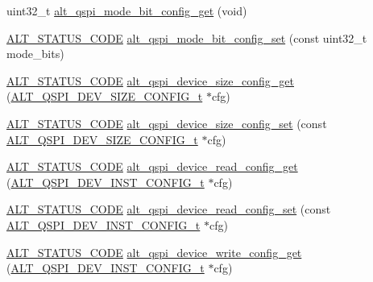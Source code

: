 \begin{DoxyCompactItemize}
\item 
uint32\+\_\+t \mbox{\hyperlink{group__ALT__QSPI__DEV__CFG_ga842b7ccf9d836ca4073713967ffc1272}{alt\+\_\+qspi\+\_\+mode\+\_\+bit\+\_\+config\+\_\+get}} (void)
\item 
\mbox{\hyperlink{hwlib_8h_abdb0d369f069723ca55d6c94bcaaaa12}{A\+L\+T\+\_\+\+S\+T\+A\+T\+U\+S\+\_\+\+C\+O\+DE}} \mbox{\hyperlink{group__ALT__QSPI__DEV__CFG_gada3ca0ace7fbbf8bd1ea1ce2ad9dada0}{alt\+\_\+qspi\+\_\+mode\+\_\+bit\+\_\+config\+\_\+set}} (const uint32\+\_\+t mode\+\_\+bits)
\item 
\mbox{\hyperlink{hwlib_8h_abdb0d369f069723ca55d6c94bcaaaa12}{A\+L\+T\+\_\+\+S\+T\+A\+T\+U\+S\+\_\+\+C\+O\+DE}} \mbox{\hyperlink{group__ALT__QSPI__DEV__CFG_ga18f9aa687fa06f6ac72deade0d74e2dd}{alt\+\_\+qspi\+\_\+device\+\_\+size\+\_\+config\+\_\+get}} (\mbox{\hyperlink{group__ALT__QSPI__DEV__CFG_gaeeacf956659047dac90f9dde87817817}{A\+L\+T\+\_\+\+Q\+S\+P\+I\+\_\+\+D\+E\+V\+\_\+\+S\+I\+Z\+E\+\_\+\+C\+O\+N\+F\+I\+G\+\_\+t}} $\ast$cfg)
\item 
\mbox{\hyperlink{hwlib_8h_abdb0d369f069723ca55d6c94bcaaaa12}{A\+L\+T\+\_\+\+S\+T\+A\+T\+U\+S\+\_\+\+C\+O\+DE}} \mbox{\hyperlink{group__ALT__QSPI__DEV__CFG_ga80c5f6f70f44a4ddf9f4766b0f643b10}{alt\+\_\+qspi\+\_\+device\+\_\+size\+\_\+config\+\_\+set}} (const \mbox{\hyperlink{group__ALT__QSPI__DEV__CFG_gaeeacf956659047dac90f9dde87817817}{A\+L\+T\+\_\+\+Q\+S\+P\+I\+\_\+\+D\+E\+V\+\_\+\+S\+I\+Z\+E\+\_\+\+C\+O\+N\+F\+I\+G\+\_\+t}} $\ast$cfg)
\item 
\mbox{\hyperlink{hwlib_8h_abdb0d369f069723ca55d6c94bcaaaa12}{A\+L\+T\+\_\+\+S\+T\+A\+T\+U\+S\+\_\+\+C\+O\+DE}} \mbox{\hyperlink{group__ALT__QSPI__DEV__CFG_gaabb39817428dc541ded23202db2c5029}{alt\+\_\+qspi\+\_\+device\+\_\+read\+\_\+config\+\_\+get}} (\mbox{\hyperlink{group__ALT__QSPI__DEV__CFG_ga56516b11d66633580f54d1cc69c7aa8e}{A\+L\+T\+\_\+\+Q\+S\+P\+I\+\_\+\+D\+E\+V\+\_\+\+I\+N\+S\+T\+\_\+\+C\+O\+N\+F\+I\+G\+\_\+t}} $\ast$cfg)
\item 
\mbox{\hyperlink{hwlib_8h_abdb0d369f069723ca55d6c94bcaaaa12}{A\+L\+T\+\_\+\+S\+T\+A\+T\+U\+S\+\_\+\+C\+O\+DE}} \mbox{\hyperlink{group__ALT__QSPI__DEV__CFG_gaf6a82874a4199a30a940ac23a84d12d6}{alt\+\_\+qspi\+\_\+device\+\_\+read\+\_\+config\+\_\+set}} (const \mbox{\hyperlink{group__ALT__QSPI__DEV__CFG_ga56516b11d66633580f54d1cc69c7aa8e}{A\+L\+T\+\_\+\+Q\+S\+P\+I\+\_\+\+D\+E\+V\+\_\+\+I\+N\+S\+T\+\_\+\+C\+O\+N\+F\+I\+G\+\_\+t}} $\ast$cfg)
\item 
\mbox{\hyperlink{hwlib_8h_abdb0d369f069723ca55d6c94bcaaaa12}{A\+L\+T\+\_\+\+S\+T\+A\+T\+U\+S\+\_\+\+C\+O\+DE}} \mbox{\hyperlink{group__ALT__QSPI__DEV__CFG_gaf930e784718f5bb26125f4ad782c0d27}{alt\+\_\+qspi\+\_\+device\+\_\+write\+\_\+config\+\_\+get}} (\mbox{\hyperlink{group__ALT__QSPI__DEV__CFG_ga56516b11d66633580f54d1cc69c7aa8e}{A\+L\+T\+\_\+\+Q\+S\+P\+I\+\_\+\+D\+E\+V\+\_\+\+I\+N\+S\+T\+\_\+\+C\+O\+N\+F\+I\+G\+\_\+t}} $\ast$cfg)

\end{DoxyCompactItemize}
